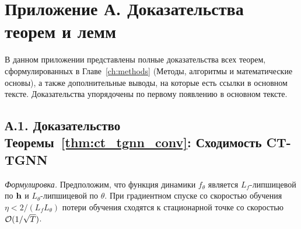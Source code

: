 
\chapter*{Приложение А. Доказательства теорем и лемм}
\label{app:proofs}

В данном приложении представлены полные доказательства всех теорем,
сформулированных в Главе~\ref{ch:methods} (Методы, алгоритмы и
математические основы), а также дополнительные выводы, на которые есть
ссылки в основном тексте. Доказательства упорядочены по первому
появлению в основном тексте.


\section*{А.1. Доказательство Теоремы~\ref{thm:ct_tgnn_conv}: Сходимость CT-TGNN}
\label{app:proof_ct_conv}

\noindent\textit{Формулировка.} Предположим, что функция динамики $f_\theta$ является $L_f$-липшицевой по $\mathbf{h}$ и $L_\theta$-липшицевой по $\theta$. При градиентном спуске со скоростью обучения $\eta<2/(L_f L_\theta)$ потери обучения сходятся к стационарной точке со скоростью $\mathcal{O}(1/\sqrt{T})$.

